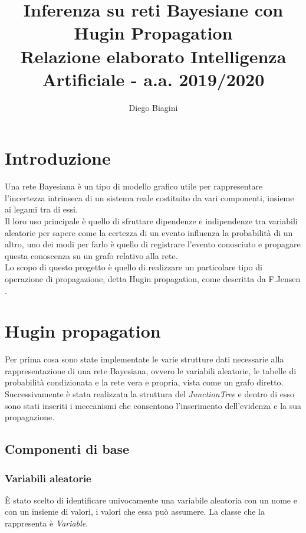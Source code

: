 \documentclass[a4paper]{article}
\title{%
  Inferenza su reti Bayesiane con Hugin Propagation \\
  \large Relazione elaborato Intelligenza Artificiale - a.a. 2019/2020}
\author{Diego Biagini}
\date{}
\begin{document}
\maketitle


\section{Introduzione}
Una rete Bayesiana è un tipo di modello grafico utile per rappresentare l'incertezza intrinseca di un sistema reale costituito da vari componenti, insieme ai legami tra di essi.\\
Il loro uso principale è quello di sfruttare dipendenze e indipendenze tra variabili aleatorie per sapere come la certezza di un evento influenza la probabilità di un altro, uno dei modi per farlo è quello di registrare l'evento conosciuto e propagare questa conoscenza su un grafo relativo alla rete.\\
Lo scopo di questo progetto è quello di realizzare un particolare tipo di operazione di propagazione, detta Hugin propagation, come descritta da F.Jensen \autocite{jensen_bnet}.
\section{Hugin propagation}
Per prima cosa sono state implementate le varie strutture dati necessarie alla rappresentazione di una rete Bayesiana, ovvero le variabili aleatorie, le tabelle di probabilità condizionata e la rete vera e propria, vista come un grafo diretto.\\
Successivamente è stata realizzata la struttura del \emph{JunctionTree} e dentro di esso sono stati inseriti i meccanismi che consentono l'inserimento dell'evidenza e la sua propagazione.
\subsection{Componenti di base}
\subsubsection{Variabili aleatorie}
È stato scelto di identificare univocamente una variabile aleatoria con un nome e con un insieme di valori, i valori che essa può assumere. La classe che la rappresenta è  \emph{Variable}.
\end{document}
